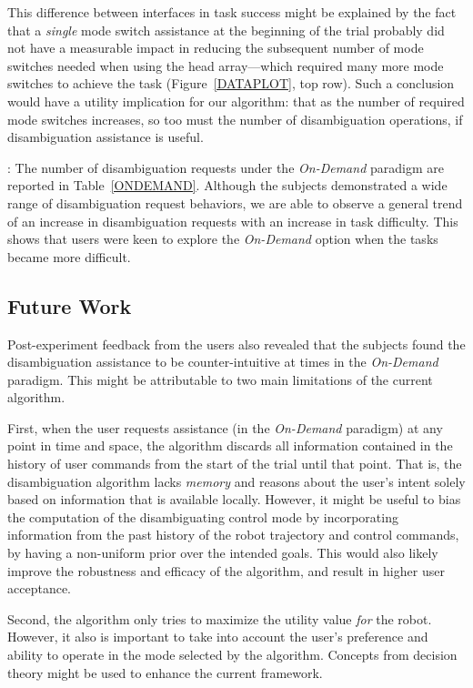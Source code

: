 \documentclass[conference]{IEEEtran}
\begin{document}
This difference between interfaces in task success might be explained by the fact that a \textit{single} mode switch assistance at the beginning of the trial probably did not have a measurable impact in reducing the subsequent number of mode switches needed when using the head array---which required many more mode switches to achieve the task (Figure~\ref{DATAPLOT}, top row). Such a conclusion would have a utility implication for our algorithm: that as the number of required mode switches increases, so too must the number of disambiguation operations, if disambiguation assistance is useful.

\vspace{0.1cm}
: The number of disambiguation requests under the \textit{On-Demand} paradigm are reported in Table~\ref{ONDEMAND}. Although the subjects demonstrated a wide range of disambiguation request behaviors, we are able to observe a general trend of an increase in disambiguation requests with an increase in task difficulty. This shows that users were keen to explore the \textit{On-Demand} option when the tasks became more difficult. 

\subsection{Future Work}
Post-experiment feedback from the users also revealed that the subjects found the disambiguation assistance to be counter-intuitive at times in the \textit{On-Demand} paradigm. This might be attributable to two main limitations of the current algorithm.

First, when the user requests assistance (in the \textit{On-Demand} paradigm) at any point in time and space, the algorithm discards all information contained in the history of user commands from the start of the trial until that point. That is, the disambiguation algorithm lacks \textit{memory} and reasons about the user's intent solely based on information that is available locally. However, it might be useful to bias the computation of the disambiguating control mode by incorporating information from the past history of the robot trajectory and control commands, by having a non-uniform prior over the intended goals. This would also likely improve the robustness and efficacy of the algorithm, and result in higher user acceptance.

Second, the algorithm only tries to maximize the utility value \textit{for} the robot. However, it also is important to take into account the user's preference and ability to operate in the mode selected by the algorithm. Concepts from decision theory might be used to enhance the current framework.
\end{document}

